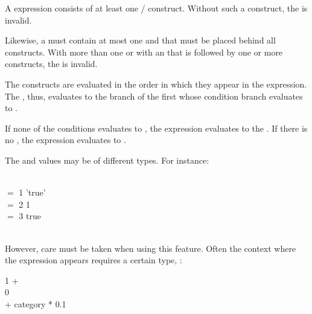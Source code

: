 A  expression consists of at least
one / construct.
Without such a construct, the 
is invalid.

Likewise, a  must contain at most
one 
and that 
must be placed behind all  constructs.
With more than one 
or with an  that is followed
by one or more  constructs,
the  is invalid.

The  constructs are evaluated
in the order in which they appear in the  expression.
The , thus, evaluates
to the  branch of the first 
whose condition branch evaluates to .

If none of the  conditions evaluates to ,
the  expression evaluates
to the  .
If there is no ,
the  expression
evaluates to .

The  and  values
may be of different types.
For instance:

\\
\hspace*{1cm}  $=$ 1
 'true' \\
\hspace*{1cm}  $=$ 2
 1 \\
\hspace*{1cm}  $=$ 3
 true \\
\hspace*{1cm}  \\

However, care must be taken when using this feature.
Often the context where the  expression
appears requires a certain type, \eg: 

 1 +
\\
\hspace*{2.5cm}  
 0 \\
\hspace*{2.5cm}  + category * 0.1 \\
\hspace*{2cm}

